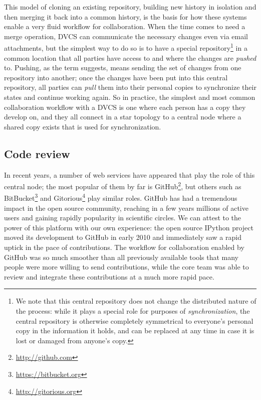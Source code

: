 \documentclass[ChapterTOCs,krantz2]{krantz} %
\theoremstyle{definition}
\begin{document}
This model of cloning an existing repository, building new history in isolation
and then merging it back into a common history, is the basis for how these
systems enable a very fluid workflow for collaboration.  When the time comes to
need a merge operation, DVCS can communicate the necessary changes even
via email attachments, but the simplest way to do so is to have a special
repository\footnote{We note that this central repository does not change the
  distributed nature of the process: while it plays a special role for purposes
  of \emph{synchronization}, the central repository is otherwise completely
  symmetrical to everyone's personal copy in the information it holds, and can
  be replaced at any time in case it is lost or damaged from anyone's copy.} in
a common location that all parties have access to and where the changes are
\emph{pushed} to.  Pushing, as the term suggests, means sending the set of
changes from one repository into another; once the changes have been put into
this central repository, all parties can \emph{pull} them into their personal
copies to synchronize their states and continue working again.  So in practice,
the simplest and most common collaboration workflow with a DVCS is one where
each person has a copy they develop on, and they all connect in a star topology
to a central node where a shared copy exists that is used for synchronization.

\subsection{Code review}

In recent years, a number of web services have appeared that play the role of
this central node; the most popular of them by far is
GitHub\footnote{\url{http://github.com}}, but others such as
BitBucket\footnote{\url{https://bitbucket.org}} and
Gitorious\footnote{\url{http://gitorious.org}} play similar roles.  GitHub has
had a tremendous impact in the open source community, reaching in a few years
millions of active users and gaining rapidly popularity in scientific circles.
We can attest to the power of this platform with our own experience: the open
source IPython project moved its development to GitHub in
early 2010 and immediately saw a rapid uptick in the pace of contributions.
The workflow for collaboration enabled by GitHub was so much smoother than all
previously available tools that many people were more willing to send
contributions, while the core team was able to review and integrate these
contributions at a much more rapid pace.
\end{document}
